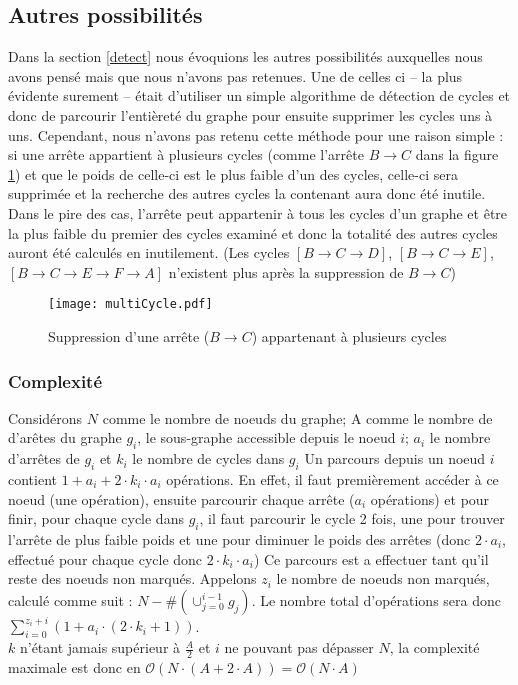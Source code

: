 \documentclass[12pt, oneside]{article}
\begin{document}
\subsection{Autres possibilités}
\label{others}
Dans la section \ref{detect} nous évoquions les autres possibilités auxquelles nous avons pensé mais que nous n'avons pas retenues.
Une de celles ci -- la plus évidente surement -- était d'utiliser un simple algorithme de détection de cycles et donc de parcourir l'entièreté du graphe pour ensuite supprimer les cycles uns à uns.
Cependant, nous n'avons pas retenu cette méthode pour une raison simple : si une arrête appartient à plusieurs cycles (comme l'arrête $B \rightarrow C$ dans la figure \ref{multiCycle}) et que le poids de celle-ci est le plus faible d'un des cycles, celle-ci sera supprimée et la recherche des autres cycles la contenant aura donc été inutile. Dans le pire des cas, l'arrête peut appartenir à tous les cycles d'un graphe et être la plus faible du premier des cycles examiné et donc la totalité des autres cycles auront été calculés en inutilement. (Les cycles $[B \rightarrow C \rightarrow D]$, $[B \rightarrow C \rightarrow E]$, $[B \rightarrow C \rightarrow E \rightarrow F \rightarrow A]$ n'existent plus après la suppression de $B \rightarrow C$)
\begin{figure}[h]
\caption{\label{multiCycle} Suppression d'une arrête ($B \rightarrow C$) appartenant à plusieurs cycles}
\center
\texttt{[image: multiCycle.pdf]}
\end{figure}
\subsubsection{Complexité}
Considérons $N$ comme le nombre de noeuds du graphe; A comme le nombre de d'arêtes du graphe $g_{i}$, le sous-graphe accessible depuis le noeud $i$; $a_{i}$ le nombre d'arrêtes de $g_{i}$ et $k_{i}$ le nombre de cycles dans $g_{i}$
Un parcours depuis un noeud $i$ contient $1 + a_{i} + 2\cdot k_{i} \cdot a_{i}$ opérations. En effet, il faut premièrement accéder à ce noeud (une opération), ensuite parcourir chaque arrête ($a_{i}$ opérations) et pour finir, pour chaque cycle dans $g_{i}$, il faut parcourir le cycle 2 fois, une pour trouver l'arrête de plus faible poids et une pour diminuer le poids des arrêtes (donc $2 \cdot a_{i} $, effectué pour chaque cycle donc $2\cdot k_{i} \cdot a_{i}$)
Ce parcours est a effectuer tant qu'il reste des noeuds non marqués. Appelons $z_{i}$ le nombre de noeuds non marqués, calculé comme suit : $N-\#(\cup_{j=0}^{i-1} g_{j})$.
Le nombre total d'opérations sera donc $\sum_{i=0}^{z_{i}+i}(1 + a_{i} \cdot(2\cdot k_{i} +1))$.\\
$k$ n'étant jamais supérieur à $\frac{A}{2}$ et $i$ ne pouvant pas dépasser $N$, la complexité maximale est donc en $\mathcal{O}(N\cdot (A + 2\cdot A)) = \mathcal{O}(N\cdot A)$
\end{document}
